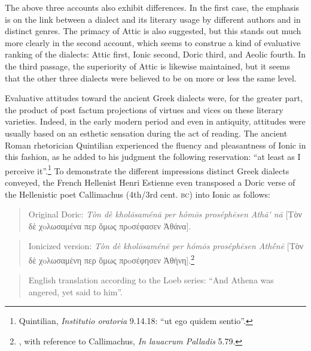 The above three accounts also exhibit differences. In the first case, the emphasis is on the link between a dialect and its literary usage by different authors and in distinct genres. The primacy of Attic is also suggested, but this stands out much more clearly in the second account, which seems to construe a kind of evaluative ranking of the dialects: Attic first, Ionic second, Doric third, and Aeolic fourth. In the third passage, the superiority of Attic is likewise maintained, but it seems that the other three dialects were believed to be on more or less the same level.

Evaluative attitudes toward the ancient Greek dialects were, for the greater part, the product of post factum projections of virtues and vices on these literary varieties. Indeed, in the early modern period and even in antiquity, attitudes were usually based on an esthetic sensation during the act of reading. The ancient Roman rhetorician Quintilian experienced the fluency and pleasantness of Ionic in this fashion, as he added to his judgment the following reservation: “at least as I perceive it”.\footnote{Quintilian, \textit{Institutio oratoria} 9.14.18: “ut ego quidem sentio”.} To demonstrate the different impressions distinct Greek dialects conveyed, the French Hellenist Henri Estienne even transposed a Doric verse of the Hellenistic poet Callimachus (4th/3rd cent. \textsc{bc}) into Ionic as follows:

\begin{quote}
Original Doric: \textit{Tòn dè kholōsaménā per hómōs proséphēsen Athā\'{} nā} [Tὸν δὲ χoλωσαμένα περ ὅμως πρoσέφασεν Ἀθάνα].
\end{quote}

\begin{quote}
Ionicized version: \textit{Tòn dè kholōsaménē per hómōs proséphēsen Athḗnē} [Tὸν δὲ χoλωσαμένη περ ὅμως πρoσέφησεν Ἀθήνη].\footnote{\citet[15--16]{Estienne1581}, with reference to Callimachus, \textit{In lauacrum Palladis} 5.79.}
\end{quote}

\begin{quote}
English translation according to the Loeb series: “And Athena was angered, yet said to him”.
\end{quote}

